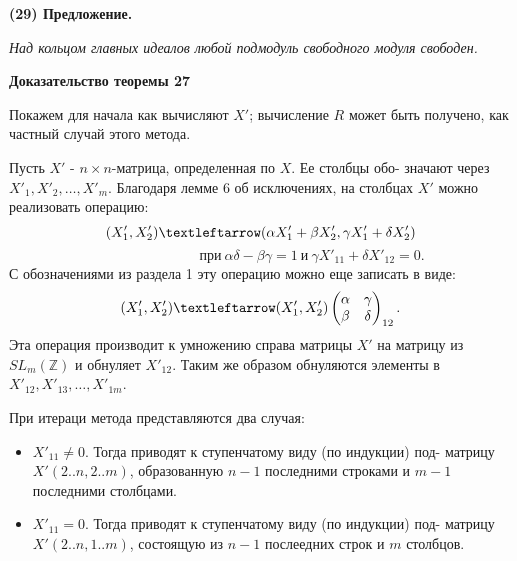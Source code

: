 	\noindent
	{\bf (29) Предложение.}
	
	{\it Над кольцом главных идеалов любой подмодуль свободного модуля\linebreak
	свободен.}
	
	\pagebreak
	
	
	\noindent
	{\bf Доказательство теоремы 27}
	
	Покажем для начала как вычисляют $X'$; вычисление $R$ может быть\linebreak
	получено, как частный случай этого метода.
	
	Пусть $X'$ - $n\times n$-матрица, определенная по $X$. Ее столбцы обо-\linebreak
	значают через $X'_{1}, X'_{2}, \ldots, X'_{m}$. Благодаря лемме 6 об исключениях, на\linebreak
	столбцах $X'$ можно реализовать операцию:
	$$(X'_1, X'_2) \textleftarrow (\alpha X'_1 + \beta X'_2, \gamma X'_1 + \delta X'_2)$$
	$$\ \ \ \ \ \ \ \ \ \ \ \ \ \ \ \ \ \ \ \ \ \ \ \ \ \ \ \ \ \ \ \ \ \text{при} \ \alpha\delta-\beta\gamma = 1 \ \text{и} \ \gamma X'_{11} + \delta X'_{12} = 0.$$
	С обозначениями из раздела 1 эту операцию можно еще записать в виде:
	$$(X'_1, X'_2) \textleftarrow (X'_1, X'_2) \begin{pmatrix} \alpha & \gamma \\ \beta & \delta \end{pmatrix}_{12}.$$
	Эта операция производит к умножению справа матрицы $X'$ на матрицу\linebreak
	из $SL_{m}(\mathbb Z)$ и обнуляет $X'_{12}$. Таким же образом обнуляются элементы в\linebreak
	$X'_{12}, X'_{13}, \ldots, X'_{1m}$.
	
	При итераци метода представляются два случая:
	
	\begin{itemize}
	\item $X'_{11} \neq 0$. Тогда приводят к ступенчатому виду (по индукции) под-\linebreak
	матрицу $X'(2..n, 2..m)$, образованную $n - 1$ последними строками\linebreak
	и $m - 1$ последними столбцами.
	
	\item $X'_{11} = 0$. Тогда приводят к ступенчатому виду (по индукции) под-\linebreak
	матрицу $X'(2..n, 1..m)$, состоящую из $n - 1$ послеедних строк и\linebreak
	$m$ столбцов.
	\end{itemize}
	

